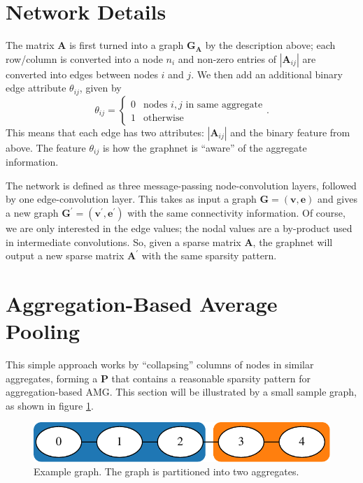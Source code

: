 \documentclass{article}
\newcommand{\abs}[1]{\left\lvert#1\right\rvert}
\newcommand{\mat}[1]{\bm{{#1}}}
\renewcommand{\vec}[1]{\bm{{#1}}}
\begin{document}
\section{Network Details}\label{sec:graphnet}
The matrix $\mat{A}$ is first turned into a graph $\mat{G}_{\mat{A}}$ by the description above; each row/column is converted into a node $n_i$ and non-zero entries of $\abs{\mat{A}_{ij}}$ are converted into edges between nodes $i$ and $j$.  We then add an additional binary edge attribute $\theta_{ij}$, given by
\begin{equation}
  \theta_{ij} = \begin{cases} 0 & \text{nodes } i,j \text{ in same aggregate} \\ 1 & \text{otherwise} \end{cases}.
\end{equation}
This means that each edge has two attributes: $\abs{\mat{A}_{ij}}$ and the binary feature from above.  The feature $\theta_{ij}$ is how the graphnet is ``aware'' of the aggregate information.

The network is defined as three message-passing node-convolution layers, followed by one edge-convolution layer.  This takes as input a graph $\mat{G} = \left(\vec{v}, \vec{e}\right)$ and gives a new graph $\mat{G}^\prime = \left(\vec{v}^\prime, \vec{e}^\prime\right)$ with the same connectivity information.  Of course, we are only interested in the edge values; the nodal values are a by-product used in intermediate convolutions.  So, given a sparse matrix $\mat{A}$, the graphnet will output a new sparse matrix $\mat{A}^\prime$ with the same sparsity pattern.

\section{Aggregation-Based Average Pooling}\label{sec:avg_pooling}
This simple approach works by ``collapsing'' columns of nodes in similar aggregates, forming a $\mat{P}$ that contains a reasonable sparsity pattern for aggregation-based AMG.  This section will be illustrated by a small sample graph, as shown in figure \ref{fig:example_graph}.

\begin{figure}[h]
  \centering
  \includegraphics{figures/agg_example.pdf}
  \caption{Example graph.  The graph is partitioned into two aggregates.}
  \label{fig:example_graph}
\end{figure}
\end{document}
